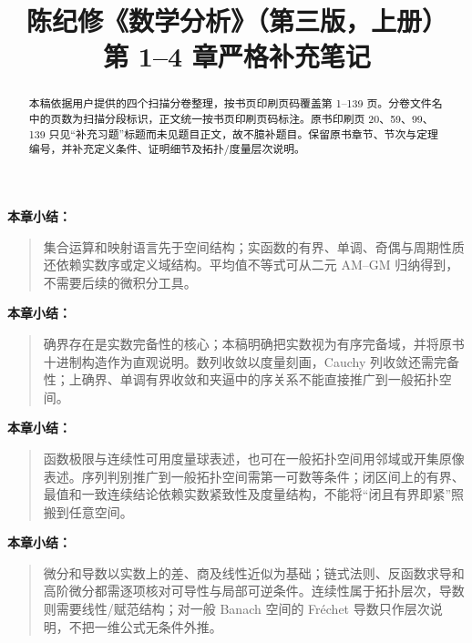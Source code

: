 \documentclass[11pt,a4paper,UTF8]{ctexart}
\title{陈纪修《数学分析》（第三版，上册）\\第 1--4 章严格补充笔记}
\author{}
\date{}
\newenvironment{chaptersummary}
  {\par\medskip\noindent\textbf{本章小结：}\begin{quote}}
  {\end{quote}}
\begin{document}
\maketitle
\begin{abstract}
本稿依据用户提供的四个扫描分卷整理，按书页印刷页码覆盖第 1--139 页。分卷文件名中的页数为扫描分段标识，正文统一按书页印刷页码标注。原书印刷页 20、59、99、139 只见“补充习题”标题而未见题目正文，故不臆补题目。保留原书章节、节次与定理编号，并补充定义条件、证明细节及拓扑/度量层次说明。
\end{abstract}
\tableofcontents
\newpage



\begin{chaptersummary}
集合运算和映射语言先于空间结构；实函数的有界、单调、奇偶与周期性质还依赖实数序或定义域结构。平均值不等式可从二元 AM--GM 归纳得到，不需要后续的微积分工具。
\end{chaptersummary}


\begin{chaptersummary}
确界存在是实数完备性的核心；本稿明确把实数视为有序完备域，并将原书十进制构造作为直观说明。数列收敛以度量刻画，Cauchy 列收敛还需完备性；上确界、单调有界收敛和夹逼中的序关系不能直接推广到一般拓扑空间。
\end{chaptersummary}


\begin{chaptersummary}
函数极限与连续性可用度量球表述，也可在一般拓扑空间用邻域或开集原像表述。序列判别推广到一般拓扑空间需第一可数等条件；闭区间上的有界、最值和一致连续结论依赖实数紧致性及度量结构，不能将“闭且有界即紧”照搬到任意空间。
\end{chaptersummary}


\begin{chaptersummary}
微分和导数以实数上的差、商及线性近似为基础；链式法则、反函数求导和高阶微分都需逐项核对可导性与局部可逆条件。连续性属于拓扑层次，导数则需要线性/赋范结构；对一般 Banach 空间的 Fr\'echet 导数只作层次说明，不把一维公式无条件外推。
\end{chaptersummary}
\end{document}
